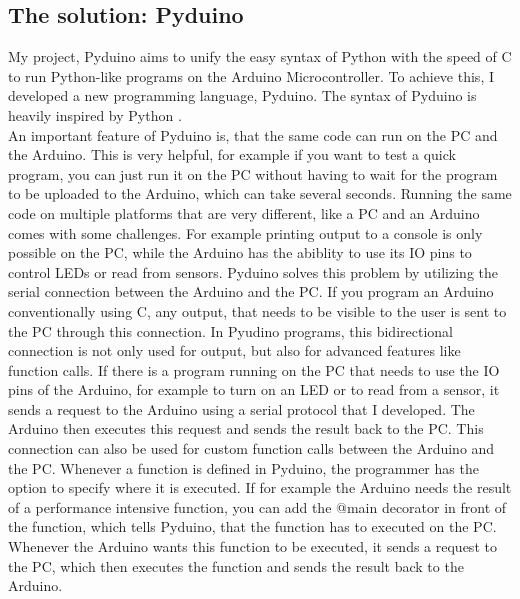 \documentclass{article}
\begin{document}
\begin{multicols}{2}
\section{The solution: Pyduino}
My project, Pyduino aims to unify the easy syntax of Python with the speed of C to run Python-like programs on the Arduino Microcontroller. To achieve this, I developed a new programming language, Pyduino. The syntax of Pyduino is heavily inspired by Python \cite{Q2}. \\
An important feature of Pyduino is, that the same code can run on the PC and the Arduino. This is very helpful, for example if you want to test a quick program, you can just run it on the PC without having to wait for the program to be uploaded to the Arduino, which can take several seconds. Running the same code on multiple platforms that are very different, like a PC and an Arduino comes with some challenges. For example printing output to a console is only possible on the PC, while the Arduino has the abiblity to use its IO pins to control LEDs or read from sensors. Pyduino solves this problem by utilizing the serial connection between the Arduino and the PC. If you program an Arduino conventionally using C, any output, that needs to be visible to the user is sent to the PC through this connection. In Pyudino programs, this bidirectional connection is not only used for output, but also for advanced features like function calls. If there is a program running on the PC that needs to use the IO pins of the Arduino, for example to turn on an LED or to read from a sensor, it sends a request to the Arduino using a serial protocol that I developed. The Arduino then executes this request and sends the result back to the PC. This connection can also be used for custom function calls between the Arduino and the PC. Whenever a function is defined in Pyduino, the programmer has the option to specify where it is executed. If for example the Arduino needs the result of a performance intensive function, you can add the @main decorator in front of the function, which tells Pyduino, that the function has to executed on the PC. Whenever the Arduino wants this function to be executed, it sends a request to the PC, which then executes the function and sends the result back to the Arduino.\\

\end{multicols}
\end{document}
